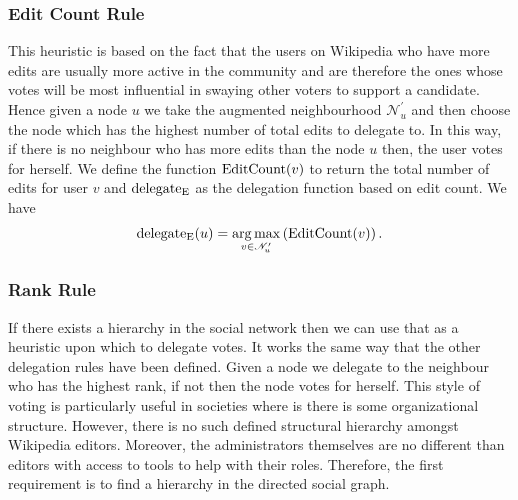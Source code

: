 \subsubsection{Edit Count Rule}
This heuristic is based on the fact that the users on Wikipedia who have more edits are usually more active in the community and are therefore the ones whose votes will be most influential in swaying other voters to support a candidate. Hence given a node $u$ we take the augmented neighbourhood $\mathcal{N}_u^{\prime}$ and then choose the node which has the highest number of total edits to delegate to. In this way, if there is no neighbour who has more edits than the node $u$ then, the user votes for herself. We define the function $\operatorname*{EditCount}(v)$ to return the total number of edits for user $v$ and $\operatorname*{delegate_E}$ as the delegation function based on edit count. We have 
\[\operatorname*{delegate_E}(u)  = \operatorname*{arg\,max}_{v \in \mathcal{N}_u^\prime} \left(\operatorname*{EditCount}(v) \right).\]

\subsubsection{Rank Rule}
If there exists a hierarchy in the social network then we can use that as a heuristic upon which to delegate votes. It works the same way that the other delegation rules have been defined. Given a node we delegate to the neighbour who has the highest rank, if not then the node votes for herself. This style of voting is particularly useful in societies where is there is some organizational structure. However, there is no such defined structural hierarchy amongst Wikipedia editors. Moreover, the administrators themselves are no different than editors with access to tools to help with their roles. Therefore, the first requirement is to find a hierarchy in the directed social graph.

